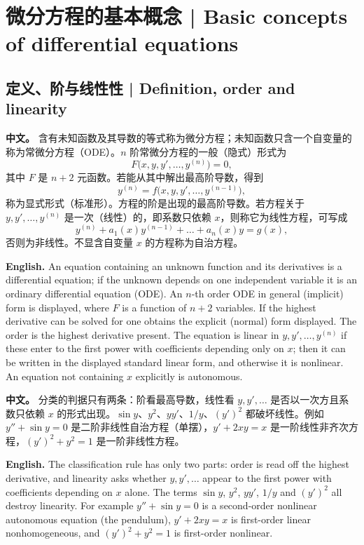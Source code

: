 \documentclass[UTF8,11pt,a4paper]{ctexart}
\newcommand{\APS}[2]{\par\noindent\textbf{中文。} #1\par\noindent\textbf{English.} #2\par}
\begin{document}
\section[基本概念]{微分方程的基本概念 | Basic concepts of differential equations}
\subsection{定义、阶与线性性 | Definition, order and linearity}
\APS{含有未知函数及其导数的等式称为微分方程；未知函数只含一个自变量的称为常微分方程（ODE）。$n$ 阶常微分方程的一般（隐式）形式为
\[
F\bigl(x,y,y',\dots,y^{(n)}\bigr)=0 ,
\]
其中 $F$ 是 $n+2$ 元函数。若能从其中解出最高阶导数，得到
\[
y^{(n)}=f\bigl(x,y,y',\dots,y^{(n-1)}\bigr),
\]
称为显式形式（标准形）。方程的阶是出现的最高阶导数。若方程关于 $y,y',\dots,y^{(n)}$ 是一次（线性）的，即系数只依赖 $x$，则称它为线性方程，可写成
\[
y^{(n)}+a_1(x)y^{(n-1)}+\dots+a_n(x)y=g(x),
\]
否则为非线性。不显含自变量 $x$ 的方程称为自治方程。}{An equation containing an unknown function and its derivatives is a differential equation; if the unknown depends on one independent variable it is an ordinary differential equation (ODE). An $n$-th order ODE in general (implicit) form is displayed, where $F$ is a function of $n+2$ variables. If the highest derivative can be solved for one obtains the explicit (normal) form displayed. The order is the highest derivative present. The equation is linear in $y,y',\dots,y^{(n)}$ if these enter to the first power with coefficients depending only on $x$; then it can be written in the displayed standard linear form, and otherwise it is nonlinear. An equation not containing $x$ explicitly is autonomous.}
\APS{分类的判据只有两条：阶看最高导数，线性看 $y,y',\dots$ 是否以一次方且系数只依赖 $x$ 的形式出现。$\sin y$、$y^2$、$yy'$、$1/y$、$(y')^2$ 都破坏线性。例如 $y''+\sin y=0$ 是二阶非线性自治方程（单摆），$y'+2xy=x$ 是一阶线性非齐次方程，$(y')^2+y^2=1$ 是一阶非线性方程。}{The classification rule has only two parts: order is read off the highest derivative, and linearity asks whether $y,y',\dots$ appear to the first power with coefficients depending on $x$ alone. The terms $\sin y$, $y^2$, $yy'$, $1/y$ and $(y')^2$ all destroy linearity. For example $y''+\sin y=0$ is a second-order nonlinear autonomous equation (the pendulum), $y'+2xy=x$ is first-order linear nonhomogeneous, and $(y')^2+y^2=1$ is first-order nonlinear.}
\end{document}
